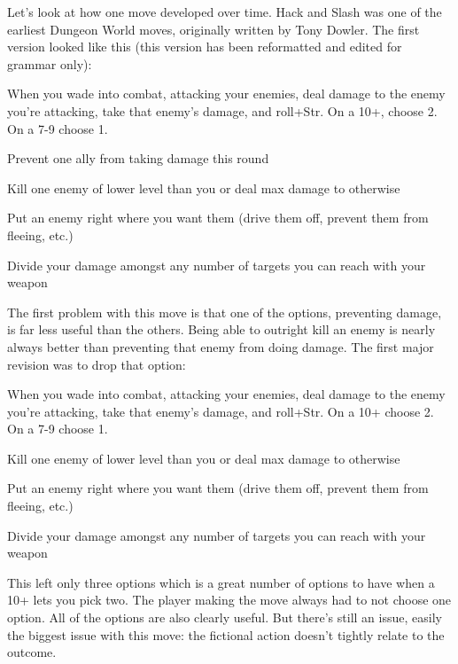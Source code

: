 Let's look at how one move developed over time. Hack and Slash was one of the earliest Dungeon World moves, originally written by Tony Dowler. The first version looked like this (this version has been reformatted and edited for grammar only):

 
\startExample
When you wade into combat, attacking your enemies, deal damage to the enemy you’re attacking, take that enemy’s damage, and roll+Str. On a 10+, choose 2. On a 7-9 choose 1.
\stopExample
 
\startitemize[1,packed]

\item Prevent one ally from taking damage this round

 
\item Kill one enemy of lower level than you or deal max damage to otherwise

 
\item Put an enemy right where you want them (drive them off, prevent them from fleeing, etc.)

 
\item Divide your damage amongst any number of targets you can reach with your weapon


\stopitemize
 

The first problem with this move is that one of the options, preventing damage, is far less useful than the others. Being able to outright kill an enemy is nearly always better than preventing that enemy from doing damage. The first major revision was to drop that option:

 
\startExample
When you wade into combat, attacking your enemies, deal damage to the enemy you’re attacking, take that enemy’s damage, and roll+Str. On a 10+ choose 2. On a 7-9 choose 1.
\stopExample
 
\startitemize[1,packed]

\item Kill one enemy of lower level than you or deal max damage to otherwise

 
\item Put an enemy right where you want them (drive them off, prevent them from fleeing, etc.)

 
\item Divide your damage amongst any number of targets you can reach with your weapon


\stopitemize
 

This left only three options which is a great number of options to have when a 10+ lets you pick two. The player making the move always had to not choose one option. All of the options are also clearly useful. But there's still an issue, easily the biggest issue with this move: the fictional action doesn't tightly relate to the outcome.

